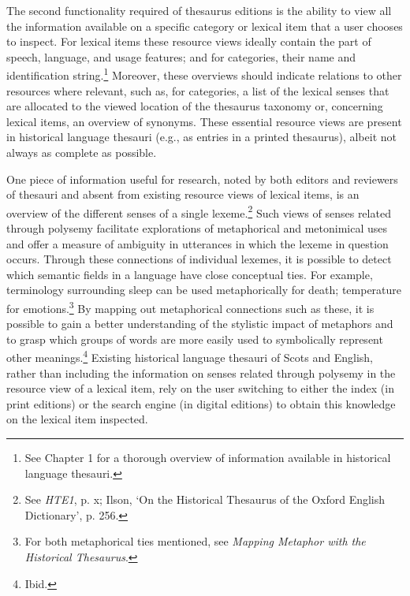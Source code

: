 The second functionality required of thesaurus editions is the ability to view all the information available on a specific category or lexical item that a user chooses to inspect. For lexical items these resource views ideally contain the part of speech, language, and usage features; and for categories, their name and identification string.\footnote{See Chapter 1 for a thorough overview of information available in historical language thesauri.} Moreover, these overviews should indicate relations to other resources where relevant, such as, for categories, a list of the lexical senses that are allocated to the viewed location of the thesaurus taxonomy or, concerning lexical items, an overview of synonyms. %
These essential resource views are present in historical language thesauri (e.g., as entries in a printed thesaurus), albeit not always as complete as possible.

One piece of information useful for research, noted by both editors and reviewers of thesauri and absent from existing resource views of lexical items, is an overview of the different senses of a single lexeme.\footnote{See \textit{HTE1}, p. x; Ilson, `On the Historical Thesaurus of the Oxford English Dictionary', %
p. 256.} Such views of senses related through polysemy facilitate explorations of metaphorical and metonimical uses and offer a measure of ambiguity in utterances in which the lexeme in question occurs. Through these connections of individual lexemes, it is possible to detect which semantic fields in a language have close conceptual ties. For example, terminology surrounding sleep can be used metaphorically for death; temperature for emotions.\footnote{For both metaphorical ties mentioned, see \textit{Mapping Metaphor with the Historical Thesaurus}.} %
By mapping out metaphorical connections such as these, it is possible to gain a better understanding of the stylistic impact of metaphors and to grasp which groups of words are more easily used to symbolically represent other meanings.\footnote{Ibid.} Existing historical language thesauri of Scots and English, rather than including the information on senses related through polysemy in the resource view of a lexical item, rely on the user switching to either the index (in print editions) or the search engine (in digital editions) to obtain this knowledge on the lexical item inspected.

